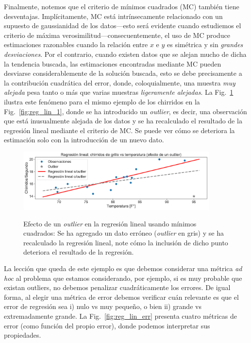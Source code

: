 Finalmente, notemos que el criterio de  mínimos cuadrados (MC) también tiene desventajas. Implícitamente, MC está intrínsecamente relacionado con un supuesto de gaussianidad de los datos---esto será evidente cuando estudiemos el criterio de máxima verosimilitud---consecuentemente, el uso de MC produce estimaciones razonables cuando la relación entre $x$  e $y$ es simétrica y sin \emph{grandes desviaciones}. Por el contrario, cuando existen datos  que se alejan mucho de dicha la tendencia buscada, las estimaciones encontradas mediante MC pueden desviarse considerablemente de la solución buscada, esto se debe precisamente a la contribución cuadrática del error, donde, coloquialmente, una muestra \emph{muy alejada} pesa tanto o más que varias muestras \emph{ligeramente alejadas}. La Fig.~\ref{fig:reg_lin_2} ilustra este fenómeno para el mismo ejemplo de los chirridos en la Fig.~\ref{fig:reg_lin_1}, donde se ha introducido un \emph{outlier}, es decir, una observación que está inusualmente alejada de los datos y se ha recalculado el resultado de la regresión lineal mediante el criterio de MC. Se puede ver cómo se deteriora la estimación solo con la introducción de un nuevo dato. 



\begin{figure}[H]
	\centering
	\includegraphics[width=0.9\textwidth]{img/cap1_chirridos_outlier.pdf}\\
	\caption{Efecto de un \emph{outlier} en la regresión lineal usando mínimos cuadrados: Se ha agregado un dato erróneo (\emph{outlier} en gris) y se ha recalculado la regresión lineal, note cómo la inclusión de dicho punto deteriora el resultado de la regresión.}
	\label{fig:reg_lin_2}
\end{figure}

La lección que queda de este ejemplo es que debemos considerar una métrica \emph{ad hoc} al problema que estamos considerando, por ejemplo, si es muy probable que existan outliers, no debemos penalizar cuadráticamente los errores. De igual forma, al elegir una métrica de error debemos verificar cuán relevante es que el error de regresión sea i) nulo vs muy pequeño, o bien ii) grande vs extremadamente grande. La Fig.~\ref{fig:reg_lin_err} presenta cuatro métricas de error (como función del propio error), donde podemos interpretar sus propiedades. 

